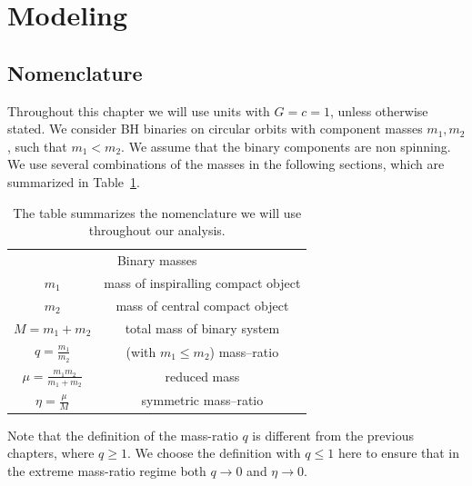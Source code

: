 \section{Modeling}
\label{one}


\subsection{Nomenclature}\label{ssec:nomenclature}
Throughout this chapter we will use units with \(G=c=1\), unless otherwise stated. We consider BH  binaries on circular orbits with component masses \(m_1, m_2\), such that \(m_1 < m_2\). We assume that the binary components are non spinning. We use several combinations of the masses in the following sections, which are summarized in Table~\ref{length}. 

\begin{table}[thb]
\centering
\begin{tabular}{|c| c| }
\hline
\multicolumn{2}{|c|}{Binary masses}  \\\cline{1-2} 
\(m_1\) & mass of inspiralling compact object  \\ [0.7ex] 
\(m_2 \) & mass of central compact object  \\ [0.7ex]  
\(M=m_1+m_2 \) & total mass of binary system \\ [0.7ex]  
\(q=\frac{m_1}{m_2} \) & (with $m_1\leq m_2$) mass--ratio \\ [0.9ex]  
\(\mu=\frac{m_1 m_2}{m_1 + m_2} \) & reduced mass \\ [0.9ex]  
\(\eta= \frac{\mu}{M}\) & symmetric mass--ratio \\ [0.9ex]  
\hline
\end{tabular}
\caption{The table summarizes the nomenclature we will use throughout our analysis.}
\label{length}
\end{table}

Note that the definition of the mass-ratio $q$ is different from the previous chapters, where
$q\geq 1$. We choose the definition with $q\leq 1$ here to ensure that in the 
extreme mass-ratio regime both $q\rightarrow 0$ and $\eta\rightarrow 0$.

